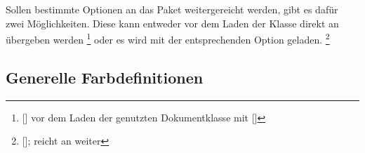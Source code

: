 \begin{Bundle*}{}
Sollen bestimmte Optionen an das Paket  weitergereicht werden, 
gibt es dafür zwei Möglichkeiten. Diese kann entweder vor dem Laden der Klasse 
direkt an  übergeben werden%
\footnote{%
  []
  vor dem Laden der genutzten Dokumentklasse mit
  []%
}
oder es wird  mit der entsprechenden Option geladen.%
\footnote{%
  [];
   reicht  an  weiter%
}
\newcommand*\cdcolorcalc{}
\newcommand*\cdcolorname{}
\newcommand*\cdcolorvalue{}
\newcommand*\cdcolortext{}
\newcommand*\cdcolor[2][0]{%
  \vskip\medskipamount\noindent%
  \begin{tikzpicture}[%
    every node/.style={%
      rectangle, minimum height=.1\linewidth, minimum width=7em%
    }%
  ]%
  \def\cdcolorcalc##1##2{%
    \pgfmathparse{100-##1*10}%
    \xdef\cdcolorname{HKS##2!\pgfmathresult}%
    \xdef\cdcolorvalue{\pgfmathresult}%
    \pgfmathparse{10+##1*10}%
  }%
  \foreach \x in {0,1,...,9}{%
    \cdcolorcalc{\x}{#2}%
    \ifnum\x<#1%
      \def\cdcolortext{white}%
    \else%
      \def\cdcolortext{black}%
    \fi%
    \node [fill=\cdcolorname,rotate=90] at (.\x\linewidth,0)%
      {\textcolor{\cdcolortext}{HKS#2!\pgfmathprintnumber\cdcolorvalue}};%
  }%
  \end{tikzpicture}%
  \par%
}



\subsection{Generelle Farbdefinitionen}




\end{Bundle*}
